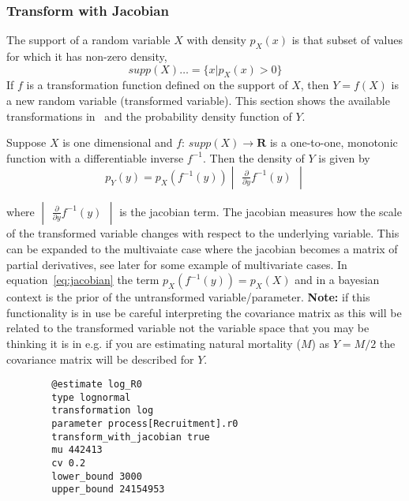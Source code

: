 \subsubsection*{Transform with Jacobian}
The support of a random variable $X$ with density $p_X(x)$ is that subset of values for which it has non-zero density, 
\begin{equation}
 supp(X) = \{x|p_X(x) > 0\}
\end{equation}
If $f$ is a transformation function defined on the support of $X$, then $Y = f(X)$ is a new random variable (transformed variable). This section shows the available transformations in \CNAME\ and the probability density function of $Y$. %

Suppose $X$ is one dimensional and $f$: $supp(X) \to \mathbf{R}$ is a one-to-one, monotonic function with a differentiable inverse $f^{-1}$. Then the density of $Y$ is given by
\begin{equation}\label{eq:jacobian}
	p_Y(y) = p_X(f^{-1}(y)) \begin{vmatrix} \frac{\partial}{\partial y} f^{-1}(y) \end{vmatrix}
\end{equation}

where $\begin{vmatrix} \frac{\partial}{\partial y} f^{-1}(y) \end{vmatrix}$ is the jacobian term. The jacobian measures how the scale of the transformed variable changes with respect to the underlying variable. This can be expanded to the multivaiate case where the jacobian becomes a matrix of partial derivatives, see later for some example of multivariate cases. In equation~\ref{eq:jacobian} the term $p_X(f^{-1}(y)) = p_X(X)$ and in a bayesian context is the prior of the untransformed variable/parameter. \textbf{Note:} if this functionality is in use be careful interpreting the covariance matrix as this will be related to the transformed variable not the variable space that you may be thinking it is in e.g. if you are estimating natural mortality ($M$) as $Y = M/2$ the covariance matrix will be described for $Y$.

{\small{\begin{verbatim}
		@estimate log_R0
		type lognormal
		transformation log
		parameter process[Recruitment].r0
		transform_with_jacobian true
		mu 442413
		cv 0.2
		lower_bound 3000
		upper_bound 24154953		 	
\end{verbatim}}}
	
